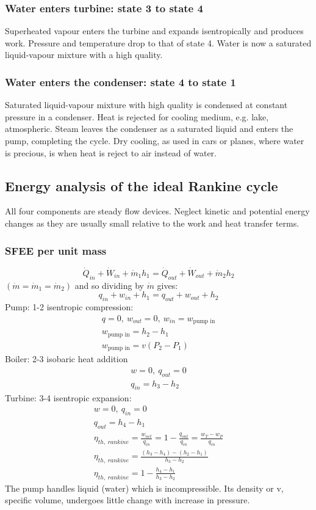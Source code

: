 \subsubsection{Water enters turbine: state 3 to state 4}
Superheated vapour enters the turbine and expands isentropically and produces work. Pressure and temperature drop to that of state 4. Water is now a saturated liquid-vapour mixture with a high quality.
\subsubsection{Water enters the condenser: state 4 to state 1}
Saturated liquid-vapour mixture with high quality is condensed at constant pressure in a condenser. Heat is rejected for cooling medium, e.g. lake, atmospheric. Steam leaves the condenser as a saturated liquid and enters the pump, completing the cycle. Dry cooling, as used in cars or planes, where water is precious, is when heat is reject to air instead of water.
\subsection{Energy analysis of the ideal Rankine cycle}
All four components are steady flow devices. Neglect kinetic and potential energy changes as they are usually small relative to the work and heat transfer terms.
\subsubsection{SFEE per unit mass}
\begin{equation}
  \dot{Q}_{in} + \dot{W}_{in} + \dot{m}_1 h_1 = \dot{Q}_{out} + \dot{W}_{out} + \dot{m}_2 h_2
\end{equation}
$(\dot{m} = \dot{m}_1 = \dot{m}_2)$ and so dividing by $\dot{m}$ gives:
\begin{equation}
  q_{in} + w_{in} + h_1 = q_{out} + w_{out} + h_2
\end{equation}
Pump: 1-2 isentropic compression:
\begin{gather}
  q = 0,\  w_{out} = 0, \ w_{in} = w_{\textrm{pump in}}\\
  w_{\textrm{pump in}} = h_2 - h_1\\
  w_{\textrm{pump in}} = v(P_2 - P_1)
\end{gather}
Boiler: 2-3 isobaric heat addition
\begin{gather}
  w = 0,\  q_{out} = 0\\
  q_{in} = h_3 - h_2
\end{gather}
Turbine: 3-4 isentropic expansion:
\begin{gather}
  w = 0,\ q_{in} = 0\\
  q_{out} = h_4 - h_1\\
  \eta_{th, \ rankine} = \frac{w_{net}}{q_{in}} = 1 - \frac{q_{out}}{q_{in}} = \frac{w_T - w_P}{q_{in}}\\
  \eta_{th, \ rankine} = \frac{(h_3 - h_4) - (h_2 - h_1)}{h_3 - h_2}\\
  \eta_{th, \ rankine} = 1 - \frac{h_4 - h_1}{h_3 - h_2}
\end{gather}
The pump handles liquid (water) which is incompressible. Its density or v, specific volume, undergoes little change with increase in pressure.
